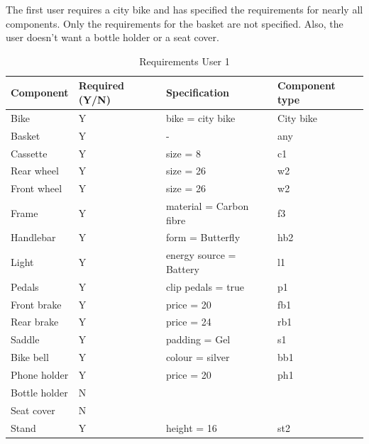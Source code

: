 The first user requires a city bike and has specified the requirements for nearly all components.  Only the requirements for the basket are not specified.  Also, the user doesn't want a bottle holder or a seat cover. 

\begin{table}[]
\centering
\begin{tabular}{llll}
\hline
Component     & Required   (Y/N) & Specification           & Component type \\ \hline 
Bike          & Y                & bike = city bike        & City bike      \\
Basket        & Y                & -                       & any            \\
Cassette      & Y                & size = 8                & c1             \\
Rear wheel    & Y                & size = 26               & w2             \\
Front wheel   & Y                & size = 26               & w2             \\
Frame         & Y                & material = Carbon fibre & f3             \\
Handlebar     & Y                & form = Butterfly        & hb2            \\
Light         & Y                & energy source = Battery & l1             \\
Pedals        & Y                & clip pedals = true      & p1             \\
Front brake   & Y                & price = 20              & fb1            \\
Rear brake    & Y                & price = 24              & rb1            \\
Saddle        & Y                & padding = Gel           & s1             \\
Bike bell     & Y                & colour = silver         & bb1            \\
Phone holder  & Y                & price = 20              & ph1            \\
Bottle holder & N                &                         &                \\
Seat cover    & N                &                         &                \\
Stand         & Y                & height = 16             & st2            \\ \hline \end{tabular}
\caption{Requirements User 1}
\label{tab:userreq1}
\end{table}                                   

